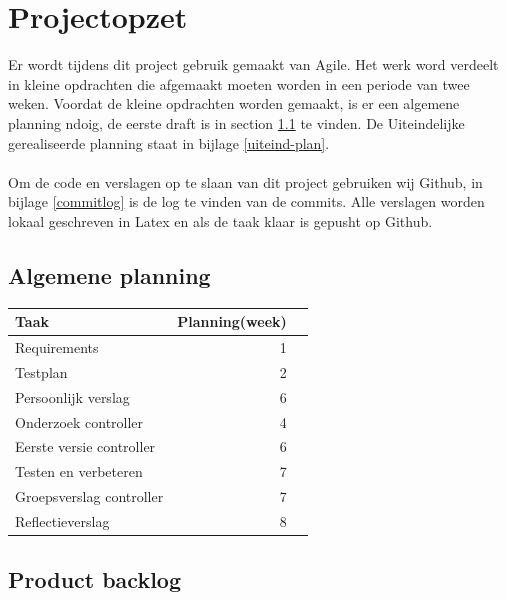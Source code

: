 \documentclass{article}
\begin{document}
\section{Projectopzet}
Er wordt tijdens dit project gebruik gemaakt van Agile. Het werk word verdeelt in kleine opdrachten die afgemaakt moeten worden in een periode van twee weken. Voordat de kleine opdrachten worden gemaakt, is er een algemene planning ndoig, de eerste draft is in section \ref{eerste-draft} te vinden. De Uiteindelijke gerealiseerde planning staat in bijlage \ref{uiteind-plan}.\\\\
Om de code en verslagen op te slaan van dit project gebruiken wij Github, in bijlage \ref{commitlog} is de log te vinden van de commits. Alle verslagen worden lokaal geschreven in Latex en als de taak klaar is gepusht op Github.

\subsection{Algemene planning}
\label{eerste-draft}
\begin{table}[h!]
\begin{tabularx}{\textwidth}{l r r}
 \textbf{Taak} & \textbf{Planning(week)}  \\ \hline
 Requirements & 1 \\
 Testplan & 2  \\
 Persoonlijk verslag & 6 \\
 Onderzoek controller & 4 \\
 Eerste versie controller & 6  \\
 Testen en verbeteren & 7  \\
 Groepsverslag controller & 7  \\
 Reflectieverslag & 8  \\
\end{tabularx}
\end{table}

\newpage

\subsection*{Product backlog}
\end{document}
